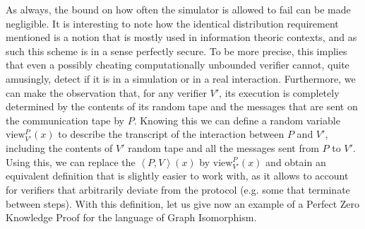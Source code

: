 \documentclass{article}
\begin{document}
As always, the bound on how often the simulator is allowed to fail can be made negligible.
It is interesting to note how the identical distribution requirement mentioned is a notion that is mostly used in information
theoric contexts, and as such this scheme is in a sense perfectly secure. To be more precise, this implies that even
a possibly cheating computationally unbounded verifier cannot, quite amusingly, detect if it is in a simulation or in a real interaction.
Furthermore, we can make the observation that, for any verifier $V'$, its execution is completely determined by the contents of its random tape and the messages that
are sent on the communication tape by $P$. Knowing this we can define a random variable $\text{view}^{P}_{V'}(x)$ to describe the transcript of the interaction between $P$ and $V'$, including the contents of $V'$ random tape and all the messages sent from $P$ to $V'$.
Using this, we can replace the $\left<P, V\right>(x)$ by $\text{view}^{P}_{V'}(x)$ and obtain an equivalent definition that is slightly easier to work with, as it allows to account for verifiers that arbitrarily deviate from the protocol (e.g. some that terminate between steps).
With this definition, let us give now an example of a Perfect Zero Knowledge Proof for the language of Graph Isomorphism.
\end{document}
